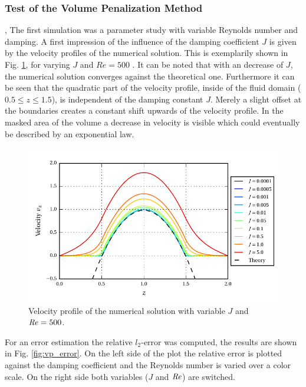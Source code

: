 \subsubsection{Test of the Volume Penalization Method}
,
The first simulation was  a parameter study with variable Reynolds number and damping.
A first impression of the influence of the damping coefficient $J$ is given by the velocity profiles of the numerical solution.
This is exemplarily shown in Fig. \ref{fig:vp_flow}, for varying $J$ and $Re=500$ .
It can be noted that with an decrease of $J$, the numerical solution converges against the theoretical one.
Furthermore it can be seen that the quadratic part of the velocity profile,
inside of the fluid domain ($0.5\leq z \leq 1.5$), is independent of the damping constant $J$.
Merely a slight offset at the boundaries creates a constant shift upwards of the velocity profile.
In the masked area of the volume a decrease in velocity is visible which could  eventually be described by an
exponential law.

\begin{figure}[!t]
  \centering
  \includegraphics{gfx/immersed_boundary/poiseuille_flow/2_vp/vp_profile.pdf}  \caption{\label{fig:vp_flow}
    Velocity profile of the numerical solution with variable $J$ and $\mbox{\textit{Re}} = 500$.}
\end{figure}

For an error estimation the relative $l_2$-error was computed, the results are shown in Fig. \ref{fig:vp_error}.
On the left side of the plot the relative error is plotted against the damping coefficient and the Reynolds number is
varied over a color scale. On the right side both variables ($J$ and $\mbox{\textit{Re}}$) are switched.

